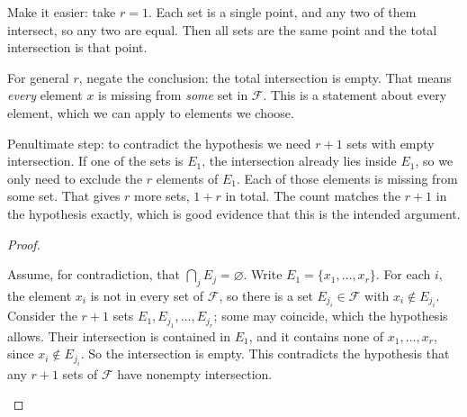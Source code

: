 \documentclass[10pt]{scrartcl}
\newcommand{\PacketInkPath}[2][]{\InkStroke[#1]{#2}}
\begin{document}
Make it easier: take $r = 1$. Each set is a single point, and any two of them intersect, so any two are equal. Then all sets are the same point and the total intersection is that point.

For general $r$, negate the conclusion: the total intersection is empty. That means \emph{every} element $x$ is missing from \emph{some} set in $\mathcal F$. This is a statement about every element, which we can apply to elements we choose.

\begin{ideabox}
  Penultimate step: to contradict the hypothesis we need $r+1$ sets with empty intersection. If one of the sets is $E_1$, the intersection already lies inside $E_1$, so we only need to exclude the $r$ elements of $E_1$. Each of those elements is missing from some set. That gives $r$ more sets, $1 + r$ in total. The count matches the $r+1$ in the hypothesis exactly, which is good evidence that this is the intended argument.
\end{ideabox}

\begin{proof}
  \begin{steps}
    \ii Assume, for contradiction, that $\bigcap_{j} E_j = \varnothing$. Write $E_1 = \{x_1, \dots, x_r\}$.
    \ii For each $i$, the element $x_i$ is not in every set of $\mathcal F$, so there is a set $E_{j_i} \in \mathcal F$ with $x_i \notin E_{j_i}$.
    \ii Consider the $r+1$ sets $E_1, E_{j_1}, \dots, E_{j_r}$; some may coincide, which the hypothesis allows. Their intersection is contained in $E_1$, and it contains none of $x_1, \dots, x_r$, since $x_i \notin E_{j_i}$. So the intersection is empty.
    \ii This contradicts the hypothesis that any $r+1$ sets of $\mathcal F$ have nonempty intersection.
  \end{steps}
\end{proof}

\begin{fig}
\end{fig}
\end{document}
